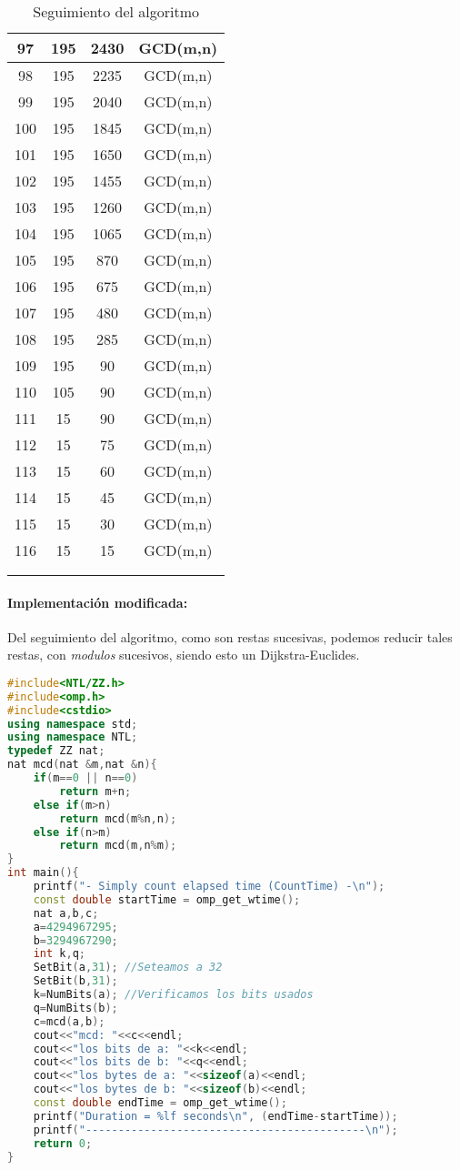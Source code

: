 \documentclass[a4paper,10pt]{article}
\begin{document}
\begin{longtable}{c|c|c|c}
97&195&2430&GCD(m,n)\\\hline
98&195&2235&GCD(m,n)\\\hline
99&195&2040&GCD(m,n)\\\hline
100&195&1845&GCD(m,n)\\\hline
101&195&1650&GCD(m,n)\\\hline
102&195&1455&GCD(m,n)\\\hline
103&195&1260&GCD(m,n)\\\hline
104&195&1065&GCD(m,n)\\\hline
105&195&870&GCD(m,n)\\\hline
106&195&675&GCD(m,n)\\\hline
107&195&480&GCD(m,n)\\\hline
108&195&285&GCD(m,n)\\\hline
109&195&90&GCD(m,n)\\\hline
110&105&90&GCD(m,n)\\\hline
111&15&90&GCD(m,n)\\\hline
112&15&75&GCD(m,n)\\\hline
113&15&60&GCD(m,n)\\\hline
114&15&45&GCD(m,n)\\\hline
115&15&30&GCD(m,n)\\\hline
116&15&15&GCD(m,n)\\\hline
\\
\caption{Seguimiento del algoritmo}
\label{ta:morse}
\end{longtable}

\paragraph{Implementaci\'on modificada:}
Del seguimiento del algoritmo, como son restas sucesivas, podemos reducir tales restas, con \emph{modulos} sucesivos, siendo esto un Dijkstra-Euclides.
\begin{lstlisting}[language=C++]
#include<NTL/ZZ.h>
#include<omp.h>
#include<cstdio>
using namespace std;
using namespace NTL;
typedef ZZ nat;
nat mcd(nat &m,nat &n){
    if(m==0 || n==0)
        return m+n;
    else if(m>n)
        return mcd(m%n,n);
    else if(n>m)
        return mcd(m,n%m);
}
int main(){
    printf("- Simply count elapsed time (CountTime) -\n");
    const double startTime = omp_get_wtime();
    nat a,b,c;
    a=4294967295;
    b=3294967290;
    int k,q;
    SetBit(a,31); //Seteamos a 32
    SetBit(b,31);
    k=NumBits(a); //Verificamos los bits usados
    q=NumBits(b);
    c=mcd(a,b);
    cout<<"mcd: "<<c<<endl;
    cout<<"los bits de a: "<<k<<endl;
    cout<<"los bits de b: "<<q<<endl;
    cout<<"los bytes de a: "<<sizeof(a)<<endl;
    cout<<"los bytes de b: "<<sizeof(b)<<endl;
    const double endTime = omp_get_wtime();
    printf("Duration = %lf seconds\n", (endTime-startTime));
    printf("-------------------------------------------\n");
    return 0;
}
\end{lstlisting}
\end{document}
